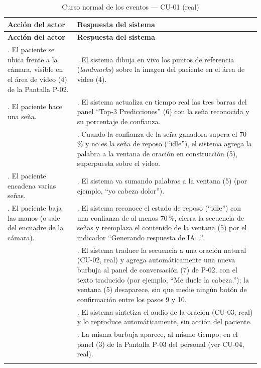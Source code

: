 \setlength{\extrarowheight}{5pt}
\begin{longtable}{@{}>{\raggedright\arraybackslash}p{} >{\raggedright\arraybackslash}p{}@{}}
\toprule
\textbf{Acción del actor} & \textbf{Respuesta del sistema} \\
\midrule
\endfirsthead
\toprule
\textbf{Acción del actor} & \textbf{Respuesta del sistema} \\
\midrule
\endhead
1. El paciente se ubica frente a la cámara, visible en el área de video
(4) de la Pantalla P-02. &
2. El sistema dibuja en vivo los puntos de referencia (\textit{landmarks})
sobre la imagen del paciente en el área de video (4). \\
3. El paciente hace una seña. &
4. El sistema actualiza en tiempo real las tres barras del panel
``Top-3 Predicciones'' (6) con la seña reconocida y su porcentaje de
confianza. \\
&
5. Cuando la confianza de la seña ganadora supera el 70\,\% y no es la
seña de reposo (``idle''), el sistema agrega la palabra a la ventana de
oración en construcción (5), superpuesta sobre el video. \\
6. El paciente encadena varias señas. &
7. El sistema va sumando palabras a la ventana (5) (por ejemplo, ``yo
cabeza dolor''). \\
8. El paciente baja las manos (o sale del encuadre de la cámara). &
9. El sistema reconoce el estado de reposo (``idle'') con una confianza de
al menos 70\,\%, cierra la secuencia de señas y
reemplaza el contenido de la ventana (5) por el indicador ``Generando
respuesta de IA...''. \\
&
10. El sistema traduce la secuencia a una oración natural (CU-02, real) y
agrega automáticamente una nueva burbuja al panel de conversación (7) de
P-02, con el texto traducido (por ejemplo, ``Me duele la cabeza.''); la
ventana (5) desaparece, sin que medie ningún botón de confirmación entre
los pasos 9 y 10. \\
&
11. El sistema sintetiza el audio de la oración (CU-03, real) y lo
reproduce automáticamente, sin acción del paciente. \\
&
12. La misma burbuja aparece, al mismo tiempo, en el panel (3) de la
Pantalla P-03 del personal (ver CU-04, real). \\
\bottomrule
\caption{Curso normal de los eventos --- CU-01 (real)}
\end{longtable}
\setlength{\extrarowheight}{0pt}

